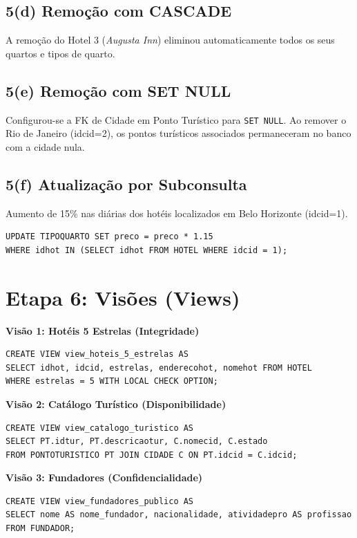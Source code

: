\documentclass[11pt, a4paper]{article}
\begin{document}
\subsection{5(d) Remoção com CASCADE}
A remoção do Hotel 3 (\textit{Augusta Inn}) eliminou automaticamente todos os seus quartos e tipos de quarto.

\subsection{5(e) Remoção com SET NULL}
Configurou-se a FK de Cidade em Ponto Turístico para \texttt{SET NULL}. Ao remover o Rio de Janeiro (idcid=2), os pontos turísticos associados permaneceram no banco com a cidade nula.

\subsection{5(f) Atualização por Subconsulta}
Aumento de 15\% nas diárias dos hotéis localizados em Belo Horizonte (idcid=1).
\begin{lstlisting}
UPDATE TIPOQUARTO SET preco = preco * 1.15
WHERE idhot IN (SELECT idhot FROM HOTEL WHERE idcid = 1);
\end{lstlisting}

\clearpage

\section{Etapa 6: Visões (Views)}

\textbf{Visão 1: Hotéis 5 Estrelas (Integridade)}
\begin{lstlisting}
CREATE VIEW view_hoteis_5_estrelas AS
SELECT idhot, idcid, estrelas, enderecohot, nomehot FROM HOTEL
WHERE estrelas = 5 WITH LOCAL CHECK OPTION;
\end{lstlisting}

\textbf{Visão 2: Catálogo Turístico (Disponibilidade)}
\begin{lstlisting}
CREATE VIEW view_catalogo_turistico AS
SELECT PT.idtur, PT.descricaotur, C.nomecid, C.estado
FROM PONTOTURISTICO PT JOIN CIDADE C ON PT.idcid = C.idcid;
\end{lstlisting}

\textbf{Visão 3: Fundadores (Confidencialidade)}
\begin{lstlisting}
CREATE VIEW view_fundadores_publico AS
SELECT nome AS nome_fundador, nacionalidade, atividadepro AS profissao
FROM FUNDADOR;
\end{lstlisting}
\end{document}
